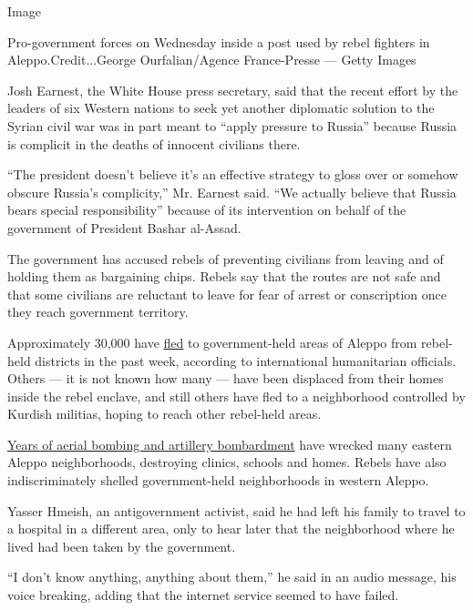 Image

Pro-government forces on Wednesday inside a post used by rebel fighters
in Aleppo.Credit...George Ourfalian/Agence France-Presse --- Getty
Images

Josh Earnest, the White House press secretary, said that the recent
effort by the leaders of six Western nations to seek yet another
diplomatic solution to the Syrian civil war was in part meant to ``apply
pressure to Russia'' because Russia is complicit in the deaths of
innocent civilians there.

``The president doesn't believe it's an effective strategy to gloss over
or somehow obscure Russia's complicity,'' Mr. Earnest said. ``We
actually believe that Russia bears special responsibility'' because of
its intervention on behalf of the government of President Bashar
al-Assad.

The government has accused rebels of preventing civilians from leaving
and of holding them as bargaining chips. Rebels say that the routes are
not safe and that some civilians are reluctant to leave for fear of
arrest or conscription once they reach government territory.

Approximately 30,000 have
\href{http://www.nytimes3xbfgragh.onion/2016/11/29/world/middleeast/thousands-flee-onslaught-in-aleppo-as-assads-forces-gain-ground.html?rref=collection\%2Ftimestopic\%2FSyria\&action=click\&contentCollection=world\&region=stream\&module=stream_unit\&version=latest\&contentPlacement=9\&pgtype=collection}{fled}
to government-held areas of Aleppo from rebel-held districts in the past
week, according to international humanitarian officials. Others --- it
is not known how many --- have been displaced from their homes inside
the rebel enclave, and still others have fled to a neighborhood
controlled by Kurdish militias, hoping to reach other rebel-held areas.

\href{http://www.nytimes3xbfgragh.onion/2016/11/21/world/middleeast/aleppo-syria-bombs-hospital.html}{Years
of aerial bombing and artillery bombardment} have wrecked many eastern
Aleppo neighborhoods, destroying clinics, schools and homes. Rebels have
also indiscriminately shelled government-held neighborhoods in western
Aleppo.

Yasser Hmeish, an antigovernment activist, said he had left his family
to travel to a hospital in a different area, only to hear later that the
neighborhood where he lived had been taken by the government.

``I don't know anything, anything about them,'' he said in an audio
message, his voice breaking, adding that the internet service seemed to
have failed.

